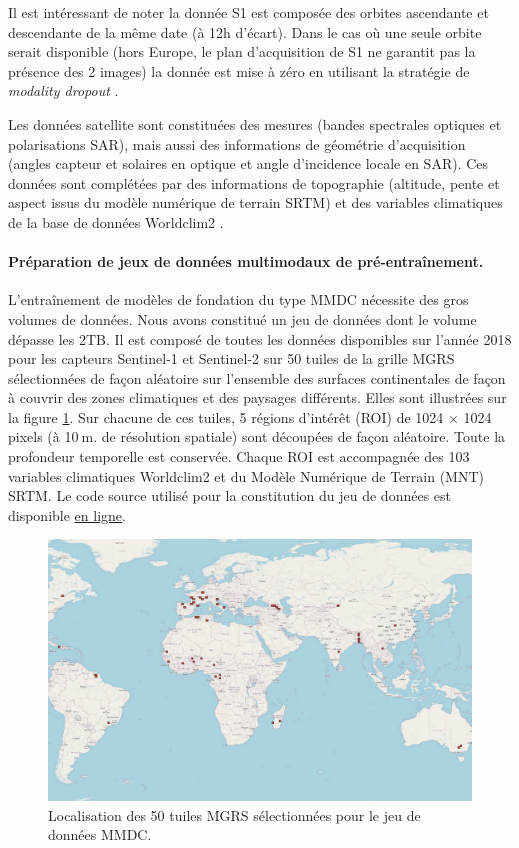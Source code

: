 Il est intéressant de noter la donnée S1 est composée des orbites ascendante et descendante de la même date (à 12h d’écart). Dans le cas où une seule orbite serait disponible (hors Europe, le plan d’acquisition de S1 ne garantit pas la présence des 2 images) la donnée est mise à zéro en utilisant la stratégie de \emph{modality dropout} \cite{neverova-2016-moddr}.

Les données satellite sont constituées des mesures (bandes spectrales optiques et polarisations SAR), mais aussi des informations de géométrie d’acquisition (angles capteur et solaires en optique et angle d’incidence locale en SAR). Ces données sont complétées par des informations de topographie (altitude, pente et aspect issus du modèle numérique de terrain SRTM) et des variables climatiques de la base de données Worldclim2 \cite{fick17_world}.

\paragraph{Préparation de jeux de données multimodaux de pré-entraînement.}

L’entraînement de modèles de fondation du type MMDC nécessite des gros volumes de données. Nous avons constitué un jeu de données dont le volume dépasse les 2TB. Il est composé de toutes les données disponibles sur l’année 2018 pour les capteurs Sentinel-1 et Sentinel-2 sur 50 tuiles de la grille MGRS sélectionnées de façon aléatoire sur l’ensemble des surfaces continentales de façon à couvrir des zones climatiques et des paysages différents. Elles sont illustrées sur la figure \ref{fig:mmdctiles}. Sur chacune de ces tuiles, 5 régions d’intérêt (ROI) de 1024 $\times$ 1024$\:$pixels (à 10$\:$m. de résolution spatiale) sont découpées de façon aléatoire. Toute la profondeur temporelle est conservée. Chaque ROI est accompagnée des 103 variables climatiques Worldclim2 et du Modèle Numérique de Terrain (MNT) SRTM. Le code source utilisé pour la constitution du jeu de données est disponible \href{https://src.koda.cnrs.fr/mmdc/mmdc-datacollection}{en ligne}.


\begin{figure}[htbp]
\begin{center}
\includegraphics[width=\columnwidth]{img/wp1/tiles.pdf}
\caption{Localisation des 50 tuiles MGRS sélectionnées pour le jeu de données MMDC.}
\label{fig:mmdctiles}
\end{center}
\end{figure}

